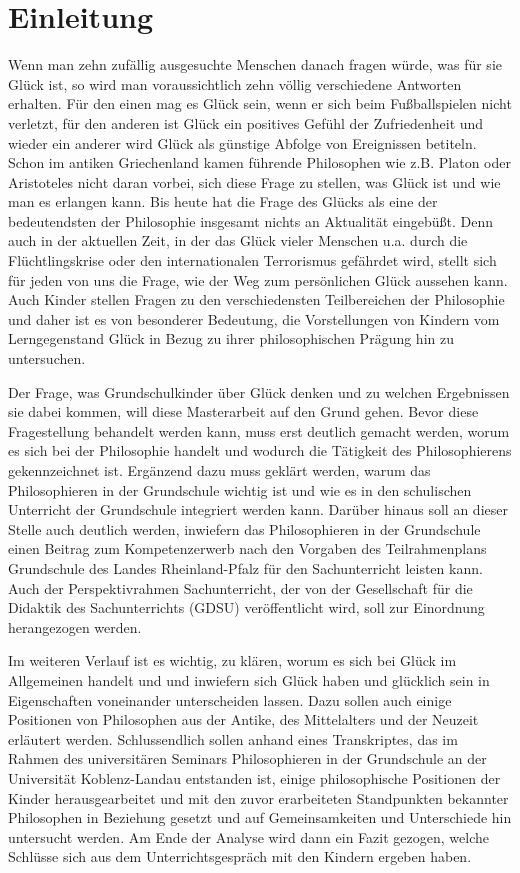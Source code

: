 \section{Einleitung}
Wenn man zehn zufällig ausgesuchte Menschen danach fragen würde, was für sie Glück ist, so wird man voraussichtlich zehn völlig verschiedene Antworten erhalten.
 Für den einen mag es Glück sein, wenn er sich beim Fußballspielen nicht verletzt, für den anderen ist Glück ein positives Gefühl der Zufriedenheit und wieder ein anderer wird Glück als günstige Abfolge von Ereignissen betiteln. 
Schon im antiken Griechenland kamen führende Philosophen wie z.B. Platon oder Aristoteles nicht daran vorbei, sich diese Frage zu stellen, was Glück ist und wie man es erlangen kann.
 Bis heute hat die Frage des Glücks als eine der bedeutendsten der Philosophie insgesamt nichts an Aktualität eingebüßt. 
 Denn auch in der aktuellen Zeit, in der das Glück vieler Menschen u.a. durch die Flüchtlingskrise oder den internationalen Terrorismus gefährdet wird, stellt sich für jeden von uns die Frage, wie der Weg zum persönlichen Glück aussehen kann.
 Auch Kinder stellen Fragen zu den verschiedensten Teilbereichen der Philosophie und daher ist es von besonderer Bedeutung, die Vorstellungen von Kindern vom Lerngegenstand Glück in Bezug zu ihrer philosophischen Prägung hin zu untersuchen.

Der Frage, was Grundschulkinder über Glück denken und zu welchen Ergebnissen sie dabei kommen, will diese Masterarbeit auf den Grund gehen. 
Bevor diese Fragestellung behandelt werden kann, muss erst deutlich gemacht werden, worum es sich bei der Philosophie handelt und wodurch die Tätigkeit des Philosophierens gekennzeichnet ist.
Ergänzend dazu muss geklärt werden, warum das Philosophieren in der Grundschule wichtig ist und wie es in den schulischen Unterricht der Grundschule integriert werden kann. 
Darüber hinaus soll an dieser Stelle auch deutlich werden, inwiefern das Philosophieren in der Grundschule einen Beitrag zum Kompetenzerwerb nach den Vorgaben des Teilrahmenplans Grundschule des Landes Rheinland-Pfalz für den Sachunterricht leisten 
kann.
Auch der Perspektivrahmen Sachunterricht, der von der Gesellschaft für die Didaktik des Sachunterrichts (GDSU) veröffentlicht wird, soll zur Einordnung herangezogen werden.

Im weiteren Verlauf ist es wichtig, zu klären, worum es sich bei Glück im Allgemeinen handelt und und inwiefern sich  \glqq Glück haben\grqq{} und  \glqq glücklich sein\grqq{} 
in Eigenschaften voneinander unterscheiden lassen. 
Dazu sollen auch einige Positionen von Philosophen aus der Antike, des Mittelalters und der Neuzeit erläutert werden. 
Schlussendlich sollen anhand eines Transkriptes, das im Rahmen des universitären Seminars \glqq Philosophieren in der Grundschule\grqq{}  an der Universität Koblenz-Landau entstanden ist, einige philosophische Positionen der Kinder herausgearbeitet und mit 
den zuvor erarbeiteten Standpunkten bekannter Philosophen in Beziehung gesetzt und auf Gemeinsamkeiten und Unterschiede hin untersucht werden. 
Am Ende der Analyse wird dann ein Fazit gezogen, welche Schlüsse sich aus dem Unterrichtsgespräch mit den Kindern ergeben haben.